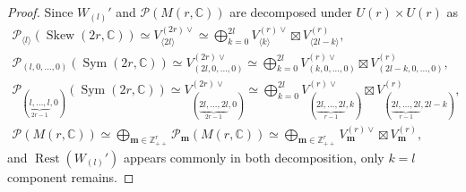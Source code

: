 \documentclass[pdftex]{sigma}
\numberwithin{equation}{section}
\newcommand{\bm}{\mathbf{m}}
\newcommand{\BZ}{\mathbb{Z}}
\newcommand{\BC}{\mathbb{C}}
\newcommand{\cP}{\mathcal{P}}
\newcommand{\Sym}{\operatorname{Sym}}
\newcommand{\Skew}{\operatorname{Skew}}
\newcommand{\Rest}{\operatorname{Rest}}
\begin{document}
\begin{proof}
Since $W_{(l)}'$ and $\cP(M(r,\BC))$ are decomposed under $U(r)\times U(r)$ as
\begin{gather*}
\cP_{\langle l\rangle}(\Skew(2r,\BC))\simeq V_{\langle 2l\rangle}^{(2r)\vee}
\simeq \bigoplus_{k=0}^{2l} V_{\langle k\rangle}^{(r)\vee}\boxtimes V_{\langle 2l-k\rangle}^{(r)},\\
\cP_{(l,0,\ldots,0)}(\Sym(2r,\BC))\simeq V_{(2l,0,\ldots,0)}^{(2r)\vee}
\simeq \bigoplus_{k=0}^{2l} V_{(k,0,\ldots,0)}^{(r)\vee}\boxtimes V_{(2l-k,0,\ldots,0)}^{(r)},\\
\cP_{(\underbrace{\scriptstyle l,\ldots,l}_{2r-1},0)}(\Sym(2r,\BC))\simeq V_{(\underbrace{\scriptstyle 2l,\ldots,2l}_{2r-1},0)}^{(2r)\vee}
\simeq \bigoplus_{k=0}^{2l} V_{(\underbrace{\scriptstyle 2l,\ldots,2l}_{r-1},k)}^{(r)\vee}
\boxtimes V_{(\underbrace{\scriptstyle 2l,\ldots,2l}_{r-1},2l-k)}^{(r)},\\
\cP(M(r,\BC))\simeq \bigoplus_{\bm\in\BZ_{++}^r}\cP_\bm(M(r,\BC))
\simeq \bigoplus_{\bm\in\BZ_{++}^r} V_\bm^{(r)\vee}\boxtimes V_\bm^{(r)},
\end{gather*}
and $\Rest(W_{(l)}')$ appears commonly in both decomposition, only $k=l$ component remains.
\end{proof}
\end{document}
